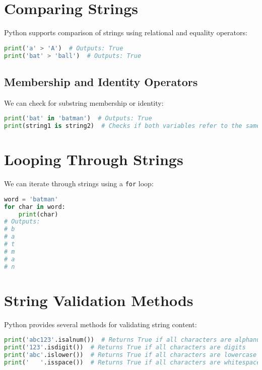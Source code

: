 \documentclass{article}
\begin{document}
\section{Comparing Strings}
Python supports comparison of strings using relational and equality operators:
\begin{lstlisting}[language=Python]
print('a' > 'A')  # Outputs: True
print('bat' > 'ball')  # Outputs: True
\end{lstlisting}

\subsection{Membership and Identity Operators}
We can check for substring membership or identity:
\begin{lstlisting}[language=Python]
print('bat' in 'batman')  # Outputs: True
print(string1 is string2)  # Checks if both variables refer to the same object
\end{lstlisting}

\section{Looping Through Strings}
We can iterate through strings using a \texttt{for} loop:
\begin{lstlisting}[language=Python]
word = 'batman'
for char in word:
    print(char)
# Outputs:
# b
# a
# t
# m
# a
# n
\end{lstlisting}

\section{String Validation Methods}
Python provides several methods for validating string content:
\begin{lstlisting}[language=Python]
print('abc123'.isalnum())  # Returns True if all characters are alphanumeric
print('123'.isdigit())  # Returns True if all characters are digits
print('abc'.islower())  # Returns True if all characters are lowercase
print('   '.isspace())  # Returns True if all characters are whitespace
\end{lstlisting}
\end{document}
